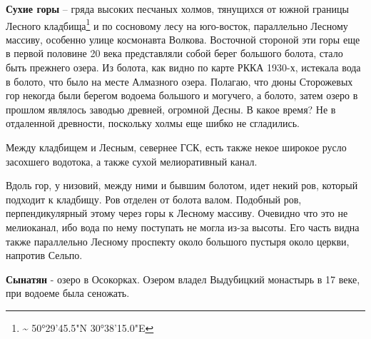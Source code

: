 

\textbf{Сухие горы} – гряда высоких песчаных холмов, тянущихся от южной границы Лесного кладбища\footnote{\textasciitilde{} 50°29'45.5"N 30°38'15.0"E} и по сосновому лесу на юго-восток, параллельно Лесному массиву, особенно улице космонавта Волкова. Восточной стороной эти горы еще в первой половине 20 века представляли собой берег большого болота, стало быть прежнего озера. Из болота, как видно по карте РККА 1930-х, истекала вода в болото, что было на месте Алмазного озера. Полагаю, что дюны Сторожевых гор некогда были берегом водоема большого и могучего, а болото, затем озеро в прошлом являлось заводью древней, огромной Десны. В какое время? Не в отдаленной древности, поскольку холмы еще шибко не сгладились.

Между кладбищем и Лесным, севернее ГСК, есть также некое широкое русло засохшего водотока, а также сухой мелиоративный канал. 

Вдоль гор, у низовий, между ними и бывшим болотом, идет некий ров, который подходит к кладбищу. Ров отделен от болота валом. 
Подобный ров, перпендикулярный этому через горы к Лесному массиву. Очевидно что это не мелиоканал, ибо вода по нему поступать не могла из-за высоты. Его часть видна также параллельно Лесному проспекту около большого пустыря около церкви, напротив Сельпо.

\medskip
 
\textbf{Сынатян} - озеро в Осокорках. Озером владел Выдубицкий монастырь в 17 веке, при водоеме была сеножать.\\

